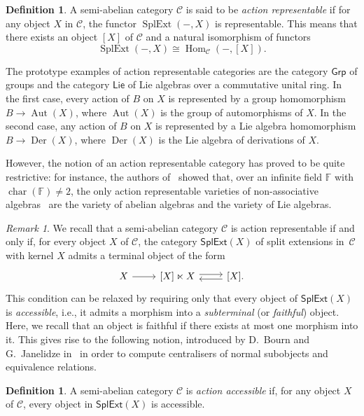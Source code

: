 \documentclass[reqno,hidelinks,a4paper]{amsart}
\theoremstyle{plain}
\theoremstyle{definition}
\newtheorem{definition}[subsection]{Definition}
\theoremstyle{remark}
\newtheorem{remark}[subsection]{Remark}
\numberwithin{equation}{section}
\newcommand{\C}{\ensuremath{\mathcal{C}}}
\newcommand{\F}{\mathbb{F}}
\DeclareMathOperator{\bchar}{char}
\DeclareMathOperator{\Aut}{Aut}
\DeclareMathOperator{\Hom}{Hom}
\DeclareMathOperator{\SplExt}{SplExt}
\DeclareMathOperator{\Der}{Der}
\newcommand{\Grp}{\ensuremath{\mathsf{Grp}}}
\newcommand{\Lie}{\ensuremath{\mathsf{Lie}}}
\newcommand{\SplExtX}{\ensuremath{\mathsf{SplExt}(X)}}
\begin{document}
\begin{definition}\cite{BJK2}
    A semi-abelian category \(\C\) is said to be \emph{action representable} if for any object \(X\) in \(\C\), the functor \(\SplExt(-,X)\) is representable. This means that there exists an object \([X]\) of \(\C\) and a natural isomorphism of functors
    \[
        \SplExt(-,X) \cong \Hom_{\C}(-,[X]).
    \]
\end{definition}

The prototype examples of action representable categories are the category \(\Grp\) of groups and the category \(\Lie\) of Lie algebras over a commutative unital ring. In the first case, every action of \(B\) on \(X\) is represented by a group homomorphism \(B \to \Aut(X)\), where \(\Aut(X)\) is the group of automorphisms of \(X\). In the second case, any action of \(B\) on \(X\) is represented by a Lie algebra homomorphism \(B \to \Der(X)\), where \(\Der(X)\) is the Lie algebra of derivations of \(X\).

However, the notion of an action representable category has proved to be quite restrictive: for instance, the authors of~\cite{Tim} showed that, over an infinite field \(\F\) with \(\bchar(\F)\neq 2\), the only action representable varieties of non-associative algebras~\cite{VdL-NAA} are the variety of abelian algebras and the variety of Lie algebras.

\begin{remark}\label{BJ}
    We recall that a semi-abelian category \(\C\) is action representable if and only if, for every object \(X\) of \(\C\), the category \(\SplExtX\) of split extensions in~\(\C\) with kernel \(X\) admits a terminal object of the form
    \[
        \begin{tikzcd}
            X \arrow[r]
            & {[X] \ltimes X} \arrow[r, shift left] &
            {[X]\text{.}} \arrow[l, shift left]
        \end{tikzcd}
    \]
    This condition can be relaxed by requiring only that every object of \(\SplExtX\) is \emph{accessible}, i.e., it admits a morphism into a \emph{subterminal} (or \emph{faithful}) object. Here, we recall that an object is faithful if there exists at most one morphism into it. This gives rise to the following notion, introduced by D.~Bourn and G.~Janelidze in~\cite{act_accessible} in order to compute centralisers of normal subobjects and equivalence relations.
\end{remark}

\begin{definition}\cite{act_accessible}
    A semi-abelian category \(\C\) is \emph{action accessible} if, for any object \(X\) of \(\C\), every object in \(\SplExtX\) is accessible.
\end{definition}
\end{document}
